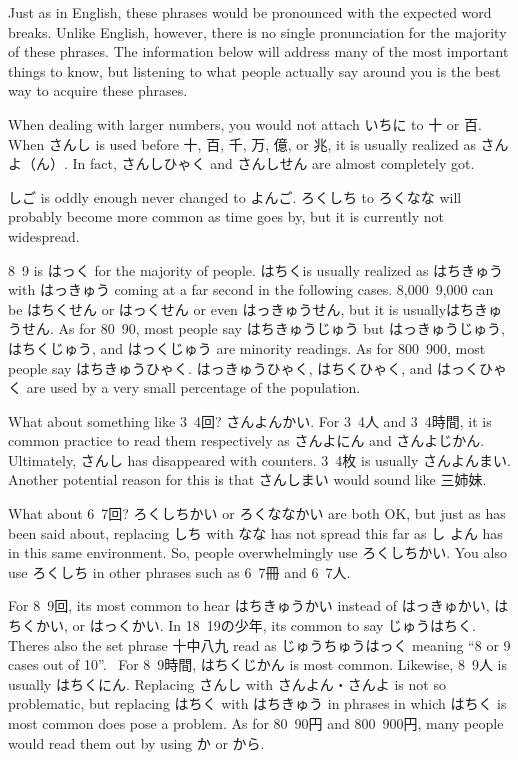 \par{ Just as in English, these phrases would be pronounced with the expected word breaks. Unlike English, however, there is no single pronunciation for the majority of these phrases. The information below will address many of the most important things to know, but listening to what people actually say around you is the best way to acquire these phrases. }

\par{ When dealing with larger numbers, you would not attach いちに to 十 or 百. When さんし is used before 十, 百, 千, 万, 億, or 兆, it is usually realized as さんよ（ん）. In fact, さんしひゃく and さんしせん are almost completely got. }

\par{ しご is oddly enough never changed to よんご. ろくしち to ろくなな will probably become more common as time goes by, but it is currently not widespread. }

\par{ 8~9 is はっく for the majority of people. はちくis usually realized as はちきゅう with はっきゅう coming at a far second in the following cases. 8,000~9,000 can be はちくせん or はっくせん or even はっきゅうせん, but it is usuallyはちきゅうせん. As for 80~90, most people say はちきゅうじゅう but はっきゅうじゅう, はちくじゅう, and はっくじゅう are minority readings. As for 800~900, most people say はちきゅうひゃく. はっきゅうひゃく, はちくひゃく, and はっくひゃく are used by a very small percentage of the population. }

\par{ What about something like 3~4回? さんよんかい. For 3~4人 and 3~4時間, it is common practice to read them respectively as さんよにん and さんよじかん. Ultimately, さんし has disappeared with counters. 3~4枚 is usually さんよんまい. Another potential reason for this is that さんしまい would sound like 三姉妹. }

\par{ What about 6~7回? ろくしちかい or ろくななかい are both OK, but just as has been said about, replacing しち with なな has not spread this far as し \textrightarrow  よん has in this same environment. So, people overwhelmingly use ろくしちかい. You also use ろくしち in other phrases such as 6~7冊 and 6~7人. }

\par{ For 8~9回, it\textquotesingle s most common to hear はちきゅうかい instead of はっきゅかい, はちくかい, or はっくかい. In 18~19の少年, it\textquotesingle s common to say じゅうはちく. There\textquotesingle s also the set phrase 十中八九 read as じゅうちゅうはっく meaning “8 or 9 cases out of 10”.  For 8~9時間, はちくじかん is most common. Likewise, 8~9人 is usually はちくにん. Replacing さんし with さんよん・さんよ is not so problematic, but replacing はちく with はちきゅう in phrases in which はちく is most common does pose a problem. As for 80~90円 and 800~900円, many people would read them out by using か or から. }

